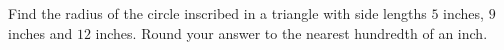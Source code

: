 Find the radius of the circle inscribed in a triangle with side lengths $5$ inches, $9$ inches and $12$ inches. Round your answer to the nearest hundredth of an inch.
